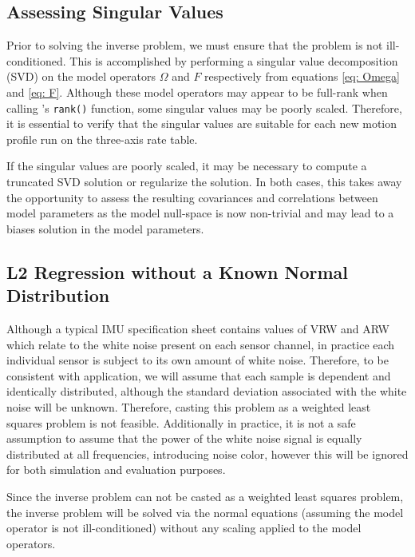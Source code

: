 \subsection{Assessing Singular Values}

Prior to solving the inverse problem, we must ensure that the problem is not ill-conditioned. This is accomplished by performing a singular value decomposition (SVD) on the model operators $\Omega$ and $F$ respectively from equations \ref{eq: Omega} and \ref{eq: F}. Although these model operators may appear to be full-rank when calling \MATLAB's \verb|rank()| function, some singular values may be poorly scaled. Therefore, it is essential to verify that the singular values are suitable for each new motion profile run on the three-axis rate table. 

If the singular values are poorly scaled, it may be necessary to compute a truncated SVD solution or regularize the solution. In both cases, this takes away the opportunity to assess the resulting covariances and correlations between model parameters as the model null-space is now non-trivial and may lead to a biases solution in the model parameters. 


\subsection{L2 Regression without a Known Normal Distribution} \label{sec: L2 regresssion}

Although a typical IMU specification sheet contains values of VRW and ARW which relate to the white noise present on each sensor channel, in practice each individual sensor is subject to its own amount of white noise. Therefore, to be consistent with application, we will assume that each sample is dependent and identically distributed, although the standard deviation associated with the white noise will be unknown. Therefore, casting this problem as a weighted least squares problem is not feasible. Additionally in practice, it is not a safe assumption to assume that the power of the white noise signal is equally distributed at all frequencies, introducing noise color, however this will be ignored for both simulation and evaluation purposes. 

Since the inverse problem can not be casted as a weighted least squares problem, the inverse problem will be solved via the normal equations (assuming the model operator is not ill-conditioned) without any scaling applied to the model operators. 

